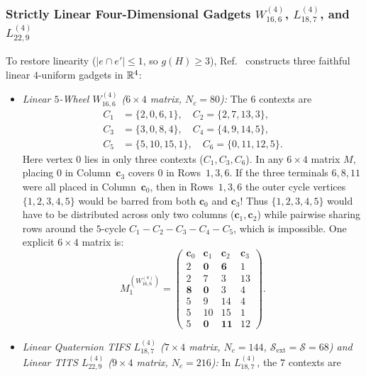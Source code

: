 \documentclass[aps,pra,reprint,superscriptaddress,longbibliography,nofootinbib,floatfix,10pt]{revtex4-2}
\theoremstyle{definition}\newtheorem{definition}[theorem]{Definition}
\theoremstyle{remark}\newtheorem{remark}[theorem]{Remark}
\newcommand{\Sc}{\mathcal S}\newcommand{\Cc}{\mathcal C}
\begin{document}
\subsubsection{Strictly Linear Four-Dimensional Gadgets \texorpdfstring{$W_{16,6}^{(4)}$, $L_{18,7}^{(4)}$, and $L_{22,9}^{(4)}$}{W16,6(4), L18,7(4), and L22,9(4)}}
To restore linearity ($|e\cap e'|\le 1$, so $g(H)\ge 3$), Ref.~\cite{svozil2026contexts} constructs three faithful linear $4$-uniform gadgets in $\mathbb R^4$:
\begin{itemize}
\item \emph{Linear $5$-Wheel $W_{16,6}^{(4)}$ ($6\times 4$ matrix, $N_c=80$):} The $6$ contexts are
\[
\begin{aligned}
C_1&=\{2,0,6,1\},\quad C_2=\{2,7,13,3\},\\
C_3&=\{3,0,8,4\},\quad C_4=\{4,9,14,5\},\\
C_5&=\{5,10,15,1\},\quad C_6=\{0,11,12,5\}.
\end{aligned}
\]
Here vertex $0$ lies in only three contexts ($C_1,C_3,C_6$). In any $6\times 4$ matrix $M$, placing $0$ in Column~$\mathbf{c}_3$ covers $0$ in Rows~$1,3,6$. If the three terminals $6,8,11$ were all placed in Column~$\mathbf{c}_0$, then in Rows~$1,3,6$ the outer cycle vertices $\{1,2,3,4,5\}$ would be barred from both $\mathbf{c}_0$ and $\mathbf{c}_3$! Thus $\{1,2,3,4,5\}$ would have to be distributed across only two columns ($\mathbf{c}_1,\mathbf{c}_2$) while pairwise sharing rows around the $5$-cycle $C_1-C_2-C_3-C_4-C_5$, which is impossible. One explicit $6\times4$ matrix is:
\begin{equation}\label{eq:W16-matrix}
M_1^{(W_{16,6}^{(4)})}=\begin{pmatrix}
\mathbf{c}_0 & \mathbf{c}_1 & \mathbf{c}_2 & \mathbf{c}_3\\\hline
2 & \mathbf{0} & \mathbf{6} & 1\\
2 & 7 & 3 & 13\\
\mathbf{8} & \mathbf{0} & 3 & 4\\
5 & 9 & 14 & 4\\
5 & 10 & 15 & 1\\
5 & \mathbf{0} & \mathbf{11} & 12
\end{pmatrix}.
\end{equation}
\item \emph{Linear Quaternion TIFS $L_{18,7}^{(4)}$ ($7\times 4$ matrix, $N_c=144$, $\Sc_{\mathrm{ext}}=\Sc=68$) and Linear TITS $L_{22,9}^{(4)}$ ($9\times 4$ matrix, $N_c=216$):} In $L_{18,7}^{(4)}$, the $7$ contexts are
\[
\begin{aligned}

\end{aligned}\]
\end{itemize}
\end{document}
